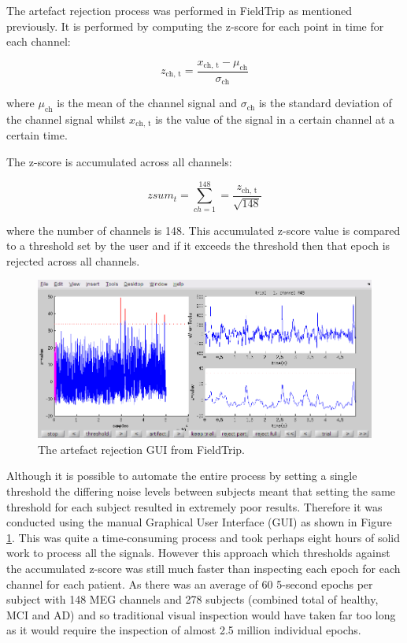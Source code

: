 The artefact rejection process was performed in FieldTrip as mentioned previously. It is performed by computing the z-score for each point in time for each channel:

\begin{equation} z_{\textrm{ch, t}} = \frac{x_{\textrm{ch, t}} - \mu_{\textrm{ch}} }{\sigma_{\textrm{ch}}} \end{equation}

where $\mu_{\textrm{ch}}$ is the mean of the channel signal and $\sigma_{\textrm{ch}}$ is the standard deviation of the channel signal whilst $x_{\textrm{ch, t}}$ is the value of the signal in a certain channel at a certain time. 

The z-score is accumulated across all channels:

\begin{equation} zsum_t = \sum\limits^{148}_{ch=1} = \frac{z_{\textrm{ch, t}}}{\sqrt{148}} \end{equation}

where the number of channels is 148. This accumulated z-score value is compared to a threshold set by the user and if it exceeds the threshold then that epoch is rejected across all channels.


\begin{figure}[h!]
  \centering
    \includegraphics[width=\textwidth]{ftartefactgui.png}
    \caption{The artefact rejection GUI from FieldTrip.}
    \label{fig:ftartefactgui}
\end{figure}



Although it is possible to automate the entire process by setting a single threshold the differing noise levels between subjects meant that setting the same threshold for each subject resulted in extremely poor results. Therefore it was conducted using the manual Graphical User Interface (GUI) as shown in Figure \ref{fig:ftartefactgui}. This was quite a time-consuming process and took perhaps eight hours of solid work to process all the signals. However this approach which thresholds against the accumulated z-score was still much faster than inspecting each epoch for each channel for each patient. As there was an average of 60 5-second epochs per subject with 148 MEG channels and 278 subjects (combined total of healthy, MCI and AD) and so traditional visual inspection would have taken far too long as it would require the inspection of almost 2.5 million individual epochs.


